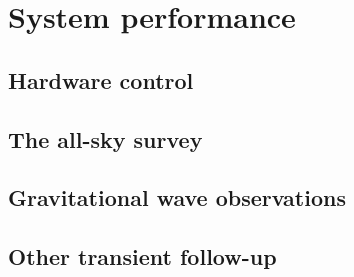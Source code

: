 \section{System performance}
\label{sec:results}
\begin{colsection}


\begin{colsection}


\end{colsection}


\subsection{Hardware control}
\label{sec:hardware_results}
\begin{colsection}


\end{colsection}


\subsection{The all-sky survey}
\label{sec:survey_results}
\begin{colsection}


\end{colsection}


\subsection{Gravitational wave observations}
\label{sec:gw_results}
\begin{colsection}


\end{colsection}


\subsection{Other transient follow-up}
\label{sec:other_results}
\begin{colsection}


\end{colsection}


\end{colsection}

